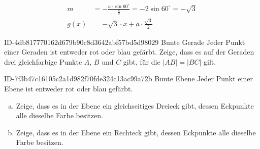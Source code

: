 \begin{exercise}
\begin{minipage}{40mm}
    \end{minipage}\hspace*{\fill}%
    \begin{minipage}{\linecalc}
      \begin{equation*}
        \begin{split}
          m&=-\frac{a\cdot\sin60^\circ}{\frac{a}{2}}=-2\sin60^\circ=-\sqrt{3} \\[2ex]
          g(x)&=-\sqrt{3}\cdot x+a\cdot\frac{\sqrt{3}}{2}
        \end{split}
      \end{equation*}
    \end{minipage}
  \fi
\end{exercise}

\begin{exercise}
      {ID-4db817770162d679b90c8d3642abf57bd5d98029}
      {Bunte Gerade}
  \ifproblem\problem
    Jeder Punkt einer Geraden ist entweder rot oder blau gefärbt.
    Zeige, dass es auf der Geraden drei gleichfarbige Punkte $A$,
    $B$ und $C$ gibt, für die $|AB|=|BC|$ gilt.
  \fi
\end{exercise}

\begin{exercise}
      {ID-7f3b47c16105c2a1d982f70fde324c13ac99a72b}
      {Bunte Ebene}
  \ifproblem\problem
    Jeder Punkt einer Ebene ist entweder rot oder blau gefärbt.
    \begin{enumerate}[a)]
      \item Zeige, dass es in der Ebene ein gleichseitiges Dreieck gibt,
            dessen Eckpunkte alle dieselbe Farbe besitzen.
      \item Zeige, dass es in der Ebene ein Rechteck gibt,
            dessen Eckpunkte alle dieselbe Farbe besitzen.
    \end{enumerate}
  \fi
\end{exercise}


